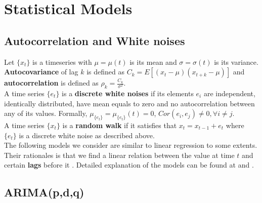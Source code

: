 \documentclass[11pt]{article}
\begin{document}
\section{Statistical Models}
\subsection{Autocorrelation and White noises}
Let $\{x_t\}$ is a timeseries with $\mu=\mu(t)$ is its mean and
$\sigma=\sigma(t)$ is its variance. \textbf{Autocovariance} of lag $k$ is
defined as $C_k=E[(x_t-\mu)(x_{t+k}-\mu)]$ and \textbf{autocorrelation} is
defined
as $\rho_k=\frac{C_k}{\sigma^2}$.\\
A time series $\{e_t\}$ is a \textbf{discrete white noises} if its elements
$e_i$ are independent, identically distributed, have mean equals to zero and no
autocorrelation between any of its values. Formally,
$\mu_{\{e_t\}}=\mu_{\{e_t\}}(t)=0$,
$Cor(e_i,e_j)\neq 0, \forall i \neq j$.\\
A time series $\{x_t\}$ is a \textbf{random walk} if it satisfies that
$x_t=x_{t-1}+e_t$ where $\{e_t\}$ is a discrete white noise as described above.\\
The following models we consider are similar to linear regression to some
extents. Their rationales is that we find a linear relation between the
value at time $t$ and certain \textbf{lags} before it . Detailed explanation of
the models can be found at \cite{GVK483463442} and \cite{quantstart}.

\subsection{ARIMA(p,d,q)}
\end{document}
